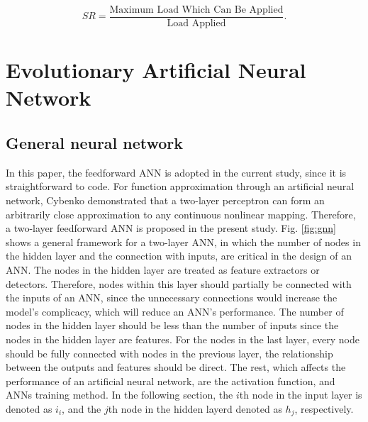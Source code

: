 \documentclass[letterpaper]{IEEEtran}
\begin{document}
\begin{equation}
	\label{eq:sr}S R=\frac{\text {Maximum Load Which Can Be Applied}}{\text {Load Applied}}\textstyle{.}
\end{equation}

\section{Evolutionary Artificial Neural Network}
\subsection{General neural network}

In this paper, the feedforward ANN is adopted in the current study, since it is
straightforward to code. For function approximation through an artificial neural
network, Cybenko demonstrated that a two-layer perceptron can form an
arbitrarily close approximation to any continuous nonlinear mapping\cite{cybenko1989approximation}.
Therefore, a two-layer feedforward ANN is proposed in the present study. Fig. \ref{fig:gnn}
shows a general framework for a two-layer ANN, in which the number of nodes in
the hidden layer and the connection with inputs, are critical in the design of
an ANN. The nodes in the hidden layer are treated as feature extractors or
detectors. Therefore, nodes within this layer should partially be connected with
the inputs of an ANN, since the unnecessary connections would increase the
model’s complicacy, which will reduce an ANN’s performance. The number of nodes
in the hidden layer should be less than the number of inputs since the nodes in
the hidden layer are features. For the nodes in the last layer, every node
should be fully connected with nodes in the previous layer, the relationship
between the outputs and features should be direct. The rest, which affects the
performance of an artificial neural network, are the activation function, and
ANNs training method. In the following section, the $i$th node in the
input layer is denoted as $i_i$, and the $j$th node in the hidden layerd denoted
as $h_j$, respectively.
\end{document}
